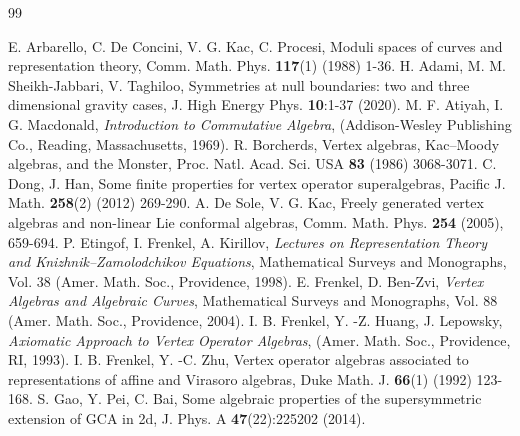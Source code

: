\documentclass[12pt]{article}
\numberwithin{equation}{section}
\theoremstyle{definition}
\theoremstyle{plain}
\begin{document}
\footnotesize
\begin{thebibliography}{99}

E. Arbarello, C. De Concini, V. G. Kac, C. Procesi, Moduli spaces of curves and representation theory, Comm. Math. Phys. \textbf{117}(1) (1988) 1-36.
H. Adami, M. M. Sheikh-Jabbari, V. Taghiloo, Symmetries at null boundaries: two and three dimensional gravity cases, J. High Energy Phys. \textbf{10}:1-37 (2020).
M. F. Atiyah, I. G. Macdonald, \textit{Introduction to Commutative Algebra}, (Addison-Wesley Publishing Co., Reading, Massachusetts, 1969).
R. Borcherds, Vertex algebras, Kac--Moody algebras, and the Monster, Proc. Natl. Acad. Sci. USA \textbf{83} (1986) 3068-3071.
C. Dong, J. Han, Some finite properties for vertex operator superalgebras, Pacific J. Math. \textbf{258}(2) (2012) 269-290.
A. De Sole, V. G. Kac, Freely generated vertex algebras and non-linear Lie conformal algebras, Comm. Math. Phys. \textbf{254} (2005), 659-694.
P. Etingof, I. Frenkel, A. Kirillov, \textit{Lectures on Representation Theory and Knizhnik–Zamolodchikov Equations}, Mathematical Surveys and Monographs, Vol. 38 (Amer. Math. Soc., Providence, 1998).
E. Frenkel, D. Ben-Zvi, \textit{Vertex Algebras and Algebraic Curves}, Mathematical Surveys and Monographs, Vol. 88 (Amer. Math. Soc., Providence, 2004).
I. B. Frenkel, Y. -Z. Huang, J. Lepowsky, \textit{Axiomatic Approach to Vertex Operator Algebras}, (Amer. Math. Soc., Providence, RI, 1993).
I. B. Frenkel, Y. -C. Zhu, Vertex operator algebras associated to representations of affine and Virasoro algebras, Duke Math. J. \textbf{66}(1) (1992) 123-168.
S. Gao, Y. Pei, C. Bai, Some algebraic properties of the supersymmetric extension of GCA in 2d, J. Phys. A \textbf{47}(22):225202 (2014).


\end{thebibliography}
\end{document}
